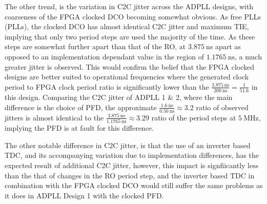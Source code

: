 The other trend, is the variation in \ac{C2C} jitter across the \ac{ADPLL} designs, with coarseness of the \ac{FPGA} clocked \ac{DCO} becoming somewhat obvious. As free \aclp{PLL} (\acsp{PLL}), the clocked \ac{DCO} has almost identical \ac{C2C} jitter and maximum \ac{TIE}, implying that only two period steps are used the majority of the time. As these steps are somewhat further apart than that of the \ac{RO}, at $3.875~\si{\nano\second}$ apart as opposed to an implementation dependant value in the region of $1.1765~\si{\nano\second}$, a much greater jitter is observed. This would confirm the belief that the \ac{FPGA} clocked designs are better suited to operational frequencies where the generated clock period to \ac{FPGA} clock period ratio is significantly lower than the $\frac{3.875~\si{\nano\second}}{200~\si{\nano\second}} = \frac{1}{51.6}$ in this design. Comparing the \ac{C2C} jitter of \ac{ADPLL} 1 \& 2, where the main difference is the choice of \ac{PFD}, the approximate $\frac{1.6~\si{\nano\second}}{0.50~\si{\nano\second}} \approx 3.2$ ratio of observed jitters is almost identical to the $\frac{3.875~\si{\nano\second}}{1.1765~\si{\nano\second}} \approx 3.29$ ratio of the period steps at $5~\si{\mega\hertz}$, implying the \ac{PFD} is at fault for this difference.

The other notable difference in \ac{C2C} jitter, is that the use of an inverter based \ac{TDC}, and its accompanying variation due to implementation differences, has the expected result of additional \ac{C2C} jitter, however, this impact is signfiicantly less than the that of changes in the \ac{RO} period step, and the inverter based \ac{TDC} in combination with the \ac{FPGA} clocked \ac{DCO} would still suffer the same problems as it does in \ac{ADPLL} Design 1 with the clocked \ac{PFD}.


